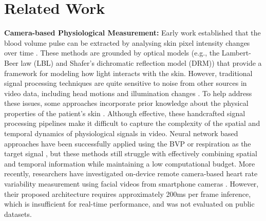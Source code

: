 \documentclass{article}
\begin{document}
\section{Related Work}

\textbf{Camera-based Physiological Measurement:}
Early work established that the blood volume pulse can be extracted by analysing skin pixel intensity changes over time \citep{takano2007heart,verkruysse2008remote}. These methods are grounded by optical models (e.g., the Lambert-Beer law (LBL) and Shafer's dichromatic reflection model (DRM)) that provide a framework for modeling how light interacts with the skin. However, traditional signal processing techniques are quite sensitive to noise from other sources in video data, including head motions and illumination changes \citep{poh2010non,poh2010advancements}. To help address these issues, some approaches incorporate prior knowledge about the physical properties of the patient's skin \citep{de2013robust,wang2016algorithmic}. Although effective, these handcrafted signal processing pipelines make it difficult to capture the complexity of the spatial and temporal dynamics of physiological signals in video. Neural network based approaches have been successfully applied using the BVP or respiration as the target signal \citep{chen2018deepphys,vspetlik2018visual,yu2019remote,song2020heart}, but these methods still struggle with effectively combining spatial and temporal information while maintaining a low computational budget. More recently, researchers have investigated on-device remote camera-based heart rate variability measurement using facial videos from smartphone cameras \citep{huynh2019vitamon}. However, their proposed architecture requires approximately 200ms per frame inference, which is insufficient for real-time performance, and was not evaluated on public datasets. 
\end{document}
